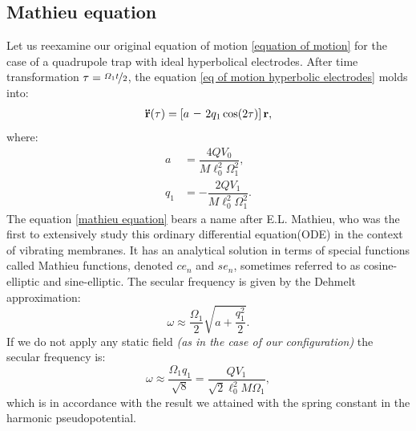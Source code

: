 \subsection{Mathieu equation}
\label{sec:mathieu equation}
Let us reexamine our original equation of motion \eqref{equation of motion} for the case of a quadrupole trap with ideal hyperbolical electrodes. After time transformation $\tau = \nicefrac{\Omega_1 t}{2}$, the equation \eqref{eq of motion hyperbolic electrodes} molds into:
\begin{equation}
	\label{mathieu equation}
	\vb{\ddot{r}}(\tau) = \left[a \minus 2 q_1 \cos(2 \tau)\right] \vb{r},
\end{equation}
where:
\begin{subequations}
\begin{align}
	a &= \dfrac{4 Q V_0}{M \ell_0^2 \Omega_1^2}, \\
	q_1 &= \minus\dfrac{2 Q V_1}{M \ell_0^2 \Omega_1^2}.
\end{align}
\end{subequations}
The equation \eqref{mathieu equation} bears a name after E.L. Mathieu, who was the first to extensively study this ordinary differential equation(ODE) in the context of vibrating membranes. It has an analytical solution \cite{5416839} in terms of special functions called Mathieu functions, denoted $ce_n$ and $se_n$, sometimes referred to as cosine-elliptic and sine-elliptic. The secular frequency is given by \cite{gerlich1992inhomogeneous} the Dehmelt approximation:
\begin{equation}
	\omega \approx \frac{\Omega_1}{2} \sqrt{a + \frac{q_1^2}{2}}.
\end{equation}
If we do not apply any static field \textit{(as in the case of our configuration)} the secular frequency is:
\begin{equation}
	\omega \approx \frac{\Omega_1 q_1}{\sqrt{8}} = \dfrac{Q V_1}{\sqrt{2}\ell_0^2 M \Omega_1},
\end{equation}
which is in accordance with the result we attained with the spring constant in the harmonic pseudopotential.

